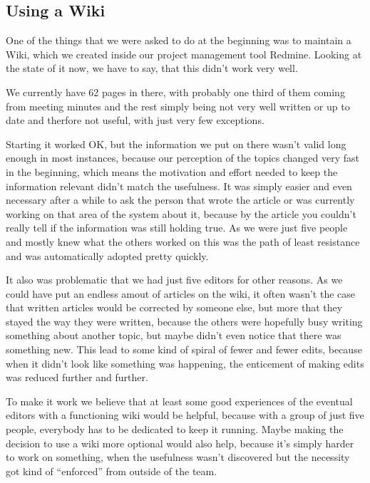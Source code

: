 \subsection{Using a Wiki}

One of the things that we were asked to do at the beginning was to maintain a Wiki, which we created inside our project management tool Redmine. Looking at the state of it now, we have to say, that this didn't work very well. 

We currently have 62 pages in there, with probably one third of them coming from meeting minutes and the rest simply being not very well written or up to date and therfore not useful, with just very few exceptions.

Starting it worked OK, but the information we put on there wasn't valid long enough in most instances, because our perception of the topics changed very fast in the beginning, which means the motivation and effort needed to keep the information relevant didn't match the usefulness. It was simply easier and even necessary after a while to ask the person that wrote the article or was currently working on that area of the system about it, because by the article you couldn't really tell if the information was still holding true. As we were just five people and mostly knew what the others worked on this was the path of least resistance and was automatically adopted pretty quickly.

It also was problematic that we had just five editors for other reasons. As we could have put an endless amout of articles on the wiki, it often wasn't the case that written articles would be corrected by someone else, but more that they stayed the way they were written, because the others were hopefully busy writing something about another topic, but maybe didn't even notice that there was something new. This lead to some kind of spiral of fewer and fewer edits, because when it didn't look like something was happening, the enticement of making edits was reduced further and further.

To make it work we believe that at least some good experiences of the eventual editors with a functioning wiki would be helpful, because with a group of just five people, everybody has to be dedicated to keep it running. Maybe making the decision to use a wiki more optional would also help, because it's simply harder to work on something, when the usefulness wasn't discovered but the necessity got kind of \enquote{enforced} from outside of the team.


